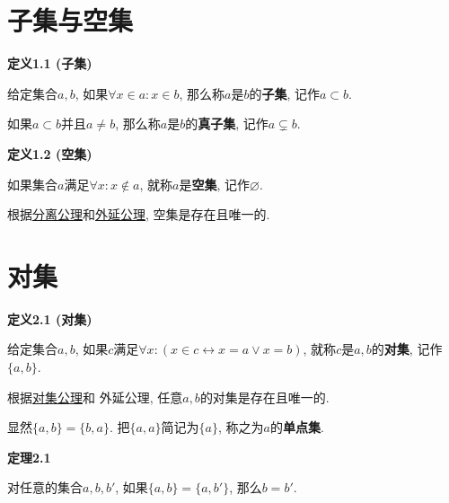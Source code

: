 


\setlength{\abovedisplayskip}{1pt}
\setlength{\belowdisplayskip}{1pt}

\section{子集与空集}

\hypertarget{sec:定义1.1}{}
\noindent\textbf{定义1.1 (子集)}

给定集合$a,b$, 如果$\forall x\in a:x\in b$,
那么称$a$是$b$的\textbf{子集}, 记作$a\subset b$.

如果$a\subset b$并且$a\neq b$, 那么称$a$是$b$的\textbf{真子集}, 记作$a\subsetneq b$.

\vspace{10pt}

\hypertarget{sec:定义1.2}{}
\noindent\textbf{定义1.2 (空集)}

如果集合$a$满足$\forall x:x\notin a$, 就称$a$是\textbf{空集}, 记作$\varnothing$.

根据\href{../01 ZFC 公理/01 ZFC 公理#nameddest=sec:分离公理模式}
{分离公理}和\href{../01 ZFC 公理/01 ZFC 公理#nameddest=sec:外延公理}{外延公理},
空集是存在且唯一的.





\vspace{20pt}

\section{对集}

\hypertarget{sec:定义2.1}{}
\noindent\textbf{定义2.1 (对集)}

给定集合$a,b$, 如果$c$满足$\forall x:(x\in c\leftrightarrow x=a\lor x=b)$,
就称$c$是$a,b$的\textbf{对集}, 记作$\{a,b\}$.

根据\href{../01 ZFC 公理/01 ZFC 公理#nameddest=sec:对集公理}{对集公理}和
外延公理, 任意$a,b$的对集是存在且唯一的.

\vspace{10pt}

显然$\{a,b\}=\{b,a\}$. 把$\{a,a\}$简记为$\{a\}$, 称之为$a$的\textbf{单点集}.

\vspace{10pt}

\hypertarget{sec:定理2.1}{}
\noindent\textbf{定理2.1}

对任意的集合$a,b,b'$, 如果$\{a,b\}=\{a,b'\}$, 那么$b=b'$.


